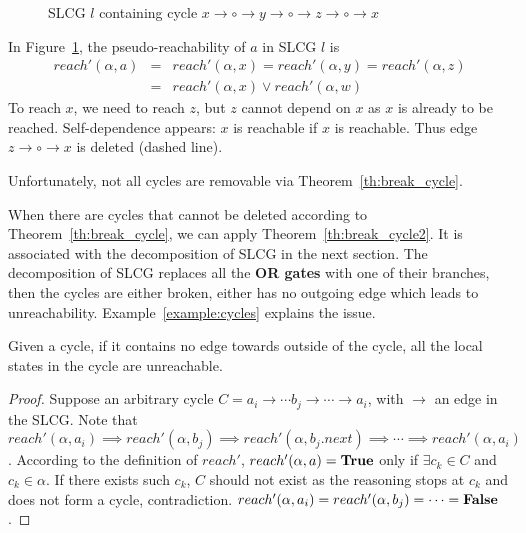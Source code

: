 \begin{example}
    \begin{figure}[ht]
        \centering
        
        \caption[SLCG with cycles]{SLCG $l$ containing cycle $x\to \circ \to y \to \circ \to z\to \circ \to x$}
        \label{cycle1}
    \end{figure}
    
    In Figure~\ref{cycle1}, the pseudo-reachability of $a$ in SLCG $l$ is 
    \begin{eqnarray*}
       reach'(\alpha,a)&=&reach'(\alpha,x)=reach'(\alpha,y)=reach'(\alpha,z)    \\
         &=&reach'(\alpha,x)\lor reach'(\alpha,w)
    \end{eqnarray*}
    To reach $x$, we need to reach $z$, but $z$ cannot depend on $x$ as $x$ is already to be reached. 
    Self-dependence appears: $x$ is reachable if $x$ is reachable.
    Thus edge $z\to \circ \to x$ is deleted (dashed line).
\end{example}
Unfortunately, not all cycles are removable via Theorem~\ref{th:break_cycle}.

When there are cycles that cannot be deleted according to Theorem~\ref{th:break_cycle}, we can apply Theorem~\ref{th:break_cycle2}.
It is associated with the decomposition of SLCG in the next section.
The decomposition of SLCG replaces all the \textbf{OR gates} with one of their branches, then the cycles are either broken, either has no outgoing edge which leads to unreachability.
Example~\ref{example:cycles} explains the issue.

\begin{theorem}\label{th:break_cycle2}
Given a cycle, if it contains no edge towards outside of the cycle, all the local states in the cycle are unreachable.
\end{theorem}

\begin{proof}
Suppose an arbitrary cycle $C=a_i\to \cdots b_j\to\cdots \to a_i$, with $\to$ an edge in the SLCG.
Note that $reach'(\alpha,a_i)\implies reach'(\alpha,b_j)\implies reach'(\alpha,b_j.next)\implies \cdots\implies reach'(\alpha,a_i)$.
According to the definition of $reach'$, $reach'(\alpha,a)=\mathbf{True}$ only if $\exists c_k\in C$ and $c_k\in \alpha$.
If there exists such $c_k$, $C$ should not exist as the reasoning stops at $c_k$ and does not form a cycle, contradiction.
$reach'(\alpha,a_i)=reach'(\alpha,b_j)=\cdots =\mathbf{False}$.
\end{proof}

